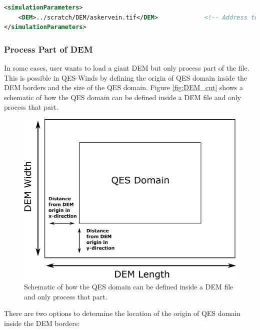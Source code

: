 \begin{lstlisting}[language=XML]
<simulationParameters>
  	<DEM>../scratch/DEM/askervein.tif</DEM>				<!-- Address to DEM location-->
</simulationParameters>
\end{lstlisting}

\subsubsection{Process Part of DEM}

In some cases, user wants to load a giant DEM but only process part of the file. This is possible in QES-Winds by defining the origin of QES domain inside the DEM borders and the size of the QES domain. Figure \ref{fig:DEM_cut} shows a schematic of how the QES domain can be defined inside a DEM file and only process that part.

\begin{figure}[h!]
\centering
\includegraphics[width=13.0cm,keepaspectratio]{Images/DEM_cut.png}
\caption{Schematic of how the QES domain can be defined inside a DEM file and only process that part. }
\end{figure}

There are two options to determine the location of the origin of QES domain inside the DEM borders:

